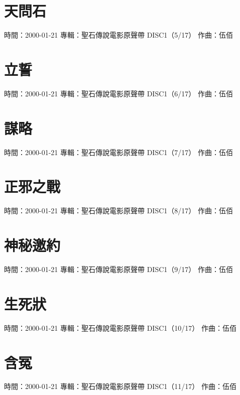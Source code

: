\documentclass[UTF8,a4paper,oneside,twocolumn,12pt]{ctexbook}
\newcommand{\infopair}[2]{\textbullet #1：#2}
\newcommand{\zq}[1][伍佰]{\infopair{作曲}{#1}}
\newcommand{\zj}[1]{\infopair{專輯}{#1}}
\newcommand{\sj}[1]{\infopair{時間}{#1}}
\newenvironment{info}{\begin{flushleft}\kaishu
	}
	{\end{flushleft}\normalsize\yahei\par}
\begin{document}
\section{天問石}
\begin{info}
	\sj{2000-01-21}
	\zj{聖石傳說電影原聲帶 DISC1（5/17）}
	\zq
\end{info}

\section{立誓}
\begin{info}
	\sj{2000-01-21}
	\zj{聖石傳說電影原聲帶 DISC1（6/17）}
	\zq
\end{info}

\section{謀略}
\begin{info}
	\sj{2000-01-21}
	\zj{聖石傳說電影原聲帶 DISC1（7/17）}
	\zq
\end{info}

\section{正邪之戰}
\begin{info}
	\sj{2000-01-21}
	\zj{聖石傳說電影原聲帶 DISC1（8/17）}
	\zq
\end{info}

\section{神秘邀約}
\begin{info}
	\sj{2000-01-21}
	\zj{聖石傳說電影原聲帶 DISC1（9/17）}
	\zq
\end{info}

\section{生死狀}
\begin{info}
	\sj{2000-01-21}
	\zj{聖石傳說電影原聲帶 DISC1（10/17）}
	\zq
\end{info}

\section{含冤}
\begin{info}
	\sj{2000-01-21}
	\zj{聖石傳說電影原聲帶 DISC1（11/17）}
	\zq
\end{info}
\end{document}
